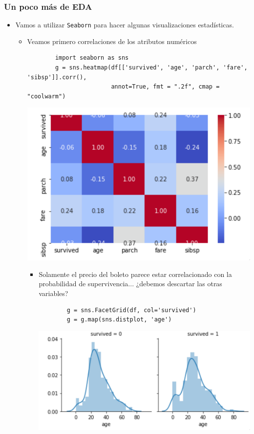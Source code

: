 \documentclass[leqno, 10pt, envcountsect]{beamer}
\numberwithin{equation}{section}
\theoremstyle{definition}
\theoremstyle{example}
\numberwithin{figure}{section}
\numberwithin{table}{section}
\let\olditem\item
\renewcommand{\item}{%
\olditem\vspace{1pt}}
\begin{document}
\begin{frame}[fragile]
  \frametitle{Un poco más de EDA}
  \begin{itemize}
    \item Vamos a utilizar \texttt{Seaborn} para hacer algunas visualizaciones
      estadísticas.
      \begin{itemize}
        \item Veamos primero correlaciones de los atributos numéricos
        \begin{verbatim}
        import seaborn as sns
        g = sns.heatmap(df[['survived', 'age', 'parch', 'fare', 'sibsp']].corr(),
                        annot=True, fmt = ".2f", cmap = "coolwarm")
        \end{verbatim}
        \begin{center}
          \includegraphics[scale=0.15]{corr.png}
        \end{center}
        \begin{itemize}
          \item Solamente el precio del boleto parece estar correlacionado con
            la probabilidad de supervivencia... ¿debemos descartar las otras
            variables?
        \begin{verbatim}
        g = sns.FacetGrid(df, col='survived')
        g = g.map(sns.distplot, 'age')
        \end{verbatim}
        \begin{center}
          \includegraphics[scale=0.14]{facet.png}
        \end{center}
        \end{itemize}
      \end{itemize}
  \end{itemize}
\end{frame}
\end{document}
